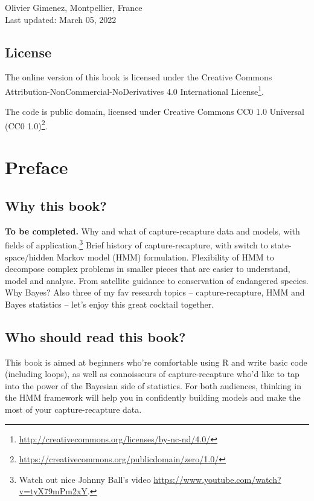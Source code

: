 \documentclass[
  12pt,
]{krantz}
\renewcommand{\href}[2]{#2\footnote{\url{#1}}}
\begin{document}
Olivier Gimenez, Montpellier, France\\
Last updated: March 05, 2022

\hypertarget{license}{%
\section*{License}\label{license}}


The online version of this book is licensed under the \href{http://creativecommons.org/licenses/by-nc-nd/4.0/}{Creative Commons Attribution-NonCommercial-NoDerivatives 4.0 International License}.

The code is public domain, licensed under \href{https://creativecommons.org/publicdomain/zero/1.0/}{Creative Commons CC0 1.0 Universal (CC0 1.0)}.

\hypertarget{preface}{%
\chapter*{Preface}\label{preface}}


\hypertarget{why-this-book}{%
\section*{Why this book?}\label{why-this-book}}


\textbf{To be completed.} Why and what of capture-recapture data and models, with fields of application.\footnote{Watch out nice Johnny Ball's video \url{https://www.youtube.com/watch?v=tyX79mPm2xY}.} Brief history of capture-recapture, with switch to state-space/hidden Markov model (HMM) formulation. Flexibility of HMM to decompose complex problems in smaller pieces that are easier to understand, model and analyse. From satellite guidance to conservation of endangered species. Why Bayes? Also three of my fav research topics -- capture-recapture, HMM and Bayes statistics -- let's enjoy this great cocktail together.

\hypertarget{who-should-read-this-book}{%
\section*{Who should read this book?}\label{who-should-read-this-book}}


This book is aimed at beginners who're comfortable using R and write basic code (including loops), as well as connoisseurs of capture-recapture who'd like to tap into the power of the Bayesian side of statistics. For both audiences, thinking in the HMM framework will help you in confidently building models and make the most of your capture-recapture data.
\end{document}
